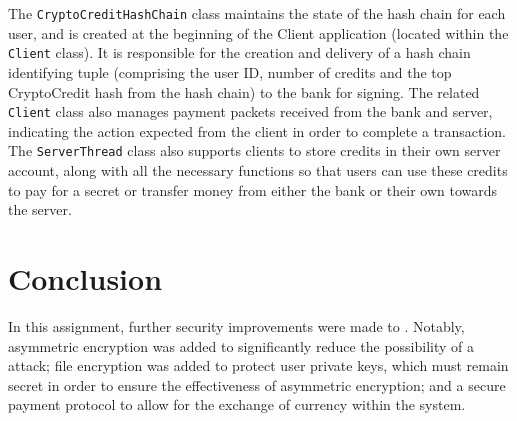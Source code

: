 \documentclass[a4paper,11pt]{article}
\begin{document}
The \verb+CryptoCreditHashChain+ class maintains the state of the hash chain for
each user, and is created at the beginning of the Client application (located
within the \verb+Client+ class). It is responsible for the creation and delivery
of a hash chain identifying tuple (comprising the user ID, number of credits and
the top CryptoCredit hash from the hash chain) to the bank for signing. The
related \verb+Client+ class also manages payment packets received from the bank
and server, indicating the action expected from the client in order to complete
a transaction. The \verb+ServerThread+ class also supports clients to store
credits in their own server account, along with all the necessary functions so
that users can use these credits to pay for a secret or transfer money from
either the bank or their own towards the server.

\section{Conclusion}
In this assignment, further security improvements were made to \packageName{}.
Notably, asymmetric encryption was added to significantly reduce the possibility
of a  attack; file encryption was added to
protect user private keys, which must remain secret in order to ensure the
effectiveness of asymmetric encryption; and a secure payment protocol to allow
for the exchange of currency within the system.
\end{document}
